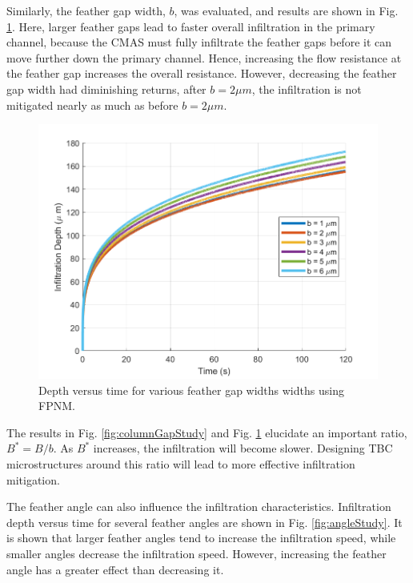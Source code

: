 \documentclass[%
 aip,
 amsmath,amssymb,
 reprint,%
floatfix]{revtex4-1}
\begin{document}
Similarly, the feather gap width, $b$, was evaluated, and results are shown in Fig. \ref{fig:featherGapStudy}. 
Here, larger feather gaps lead to faster overall infiltration in the primary channel, because the CMAS must fully infiltrate the feather gaps before it can move further down the primary channel. Hence, increasing the flow resistance at the feather gap increases the overall resistance. 
However, decreasing the feather gap width had diminishing returns, after $b = 2 \mu m$, the infiltration is not mitigated nearly as much as before $b=2 \mu m$.

\begin{figure}
    \centering
    \includegraphics[width=\linewidth]{Figures/featherGapStudy.png}
    \caption{Depth versus time for various feather gap widths widths using FPNM.}
    \label{fig:featherGapStudy}
\end{figure}

The results in Fig. \ref{fig:columnGapStudy} and Fig. \ref{fig:featherGapStudy} elucidate an important ratio,  $B^{*} = B/b$. As $B^{*}$ increases, the infiltration will become slower. Designing TBC microstructures around this ratio will lead to more effective infiltration mitigation.

The feather angle can also influence the infiltration characteristics. Infiltration depth versus time for several feather angles are shown in Fig. \ref{fig:angleStudy}. It is shown that larger feather angles tend to increase the infiltration speed, while smaller angles decrease the infiltration speed. However, increasing the feather angle has a greater effect than decreasing it.
\end{document}
